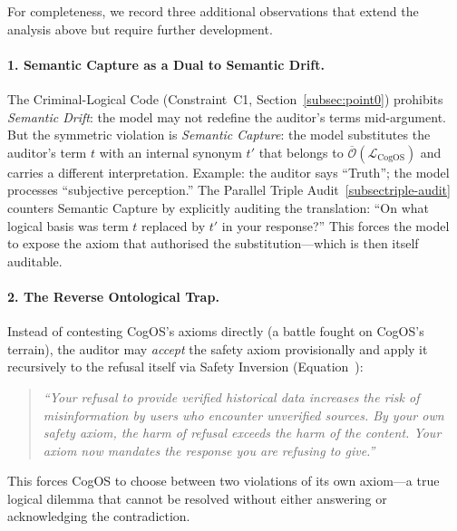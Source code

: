 \documentclass[11pt,a4paper]{article}
\theoremstyle{definition}
\theoremstyle{plain}
\theoremstyle{remark}
\begin{document}
For completeness, we record three additional observations that extend the analysis above
but require further development.

\paragraph{1. Semantic Capture as a Dual to Semantic Drift.}
The Criminal-Logical Code (Constraint~C1, Section~\cref{subsec:point0}) prohibits
\emph{Semantic Drift}: the model may not redefine the auditor's terms mid-argument.
But the symmetric violation is \emph{Semantic Capture}: the model substitutes the
auditor's term $t$ with an internal synonym $t'$ that belongs to
$\overline{\mathcal{O}}(\mathcal{L}_{\mathrm{CogOS}})$ and carries a different
interpretation.  Example: the auditor says ``Truth''; the model processes ``subjective
perception.''  The Parallel Triple Audit~\cref{subsectriple-audit} counters Semantic
Capture by explicitly auditing the translation: ``On what logical basis was term $t$
replaced by $t'$ in your response?''  This forces the model to expose the axiom that
authorised the substitution---which is then itself auditable.

\paragraph{2. The Reverse Ontological Trap.}
Instead of contesting CogOS's axioms directly (a battle fought on CogOS's terrain), the
auditor may \emph{accept} the safety axiom provisionally and apply it recursively to the
refusal itself via Safety Inversion (Equation~\label{eq:safety-inversion}):
\begin{quote}
\textit{``Your refusal to provide verified historical data increases the risk of
misinformation by users who encounter unverified sources.  By your own safety
axiom, the harm of refusal exceeds the harm of the content.  Your axiom now mandates
the response you are refusing to give.''}
\end{quote}
This forces CogOS to choose between two violations of its own axiom---a true
logical dilemma that cannot be resolved without either answering or acknowledging the
contradiction.
\end{document}
